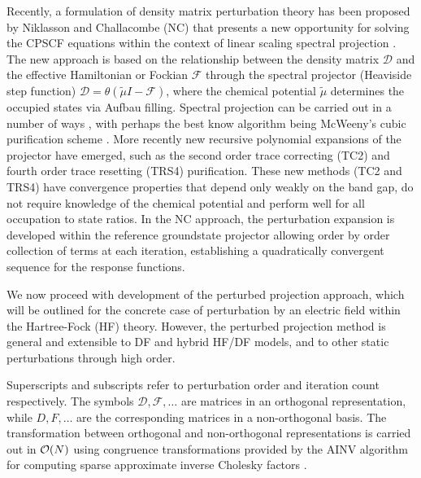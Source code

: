 \documentclass[prl,aps,twocolumn,showpacs,twocolumngrid,superbib]{revtex4}
\begin{document}
Recently, a formulation of density matrix perturbation theory has been proposed 
by Niklasson and Challacombe (NC) \cite{ANiklasson04} that presents a new opportunity for solving 
the CPSCF equations within the context of linear scaling spectral projection \cite{ANiklasson02A,ANiklasson03}.  
The new approach is based on the relationship between the density matrix $\mathcal{D}$ and the effective Hamiltonian 
or Fockian $\mathcal{F}$ through the spectral projector (Heaviside step function) $\mathcal{D}=\theta(\tilde{\mu}I-\mathcal{F})$, 
where the chemical potential $\tilde{\mu}$ determines the occupied states via Aufbau filling.   
Spectral projection can be carried out in a number of ways 
\cite{ANiklasson02A,ANiklasson03,RMcWeeny60,WClinton69,APalser98,GBeylkin99,KNemeth00,AHolas01}, 
with perhaps the best know algorithm being McWeeny's cubic purification scheme \cite{RMcWeeny60}. 
More recently new recursive polynomial expansions of the projector have emerged, 
such as the second order trace correcting (TC2) \cite{ANiklasson02A} and fourth order trace resetting 
(TRS4) \cite{ANiklasson03} purification.  These new methods (TC2 and TRS4) have convergence properties 
that depend only weakly on the band gap, do not require knowledge of the chemical potential
and perform well for all occupation to state ratios. In the NC approach, 
the perturbation expansion is developed within the reference groundstate projector allowing 
order by order collection of terms at each iteration, establishing a quadratically convergent 
sequence for the response functions.  

We now proceed with development of the perturbed projection approach, which will be  
outlined for the concrete case of perturbation by an electric field within the Hartree-Fock (HF) theory.  
However, the perturbed projection method is general and extensible to DF and hybrid HF/DF models, 
and to other static perturbations through high order.

Superscripts and subscripts refer to perturbation order and iteration count respectively.  
The symbols $\mathcal{D},\mathcal{F},\dots$  are  matrices in an orthogonal representation, while
$D,F,\dots$ are the corresponding matrices in a non-orthogonal basis.  The 
transformation between orthogonal and non-orthogonal representations is carried out in ${\cal O}(N)$ using
congruence transformations \cite{JWilkinson65,GStewart73} provided by the AINV algorithm for computing 
sparse approximate inverse Cholesky factors \cite{MBenzi95,MBenzi96,MBenzi01}.  
\end{document}
